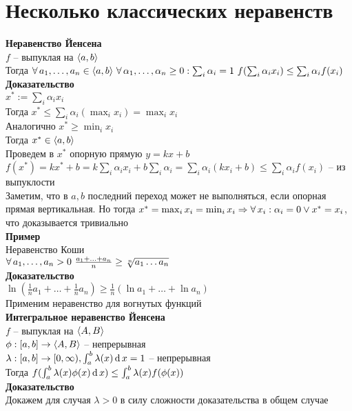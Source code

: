 \documentclass[12pt]{article}
\begin{document}
\section{Несколько классических неравенств}
\textbf{Неравенство Йенсена}\\
$f$ -- выпуклая на $\langle a, b \rangle$\\
Тогда $\fall a_1, \ldots, a_n \in \an ab\ \fall \alpha_1,\ldots,\alpha_n \geq 0: \sum_i \alpha_i = 1\ f(\sum_i \alpha_i x_i) \leq \sum_i \alpha_i f(x_i)$\\
\textbf{Доказательство}\\
$x^* := \sum_i \alpha_i x_i$\\
Тогда $x^* \leq \sum_i \alpha_i (\max_i x_i) = \max_i x_i$\\
Аналогично $x^* \geq \min_i x_i$\\
Тогда $x^* \in \langle a, b \rangle$\\
Проведем в $x^*$ опорную прямую $y = kx+b$\\
$f(x^*) = kx^*+b = k\sum_i \alpha_i x_i + b\sum_i \alpha_i = \sum_i \alpha_i(kx_i + b) \leq \sum_i \alpha_if(x_i)$ -- из выпуклости\\
Заметим, что в $a, b$ последний переход может не выполняться, если опорная прямая вертикальная. Но тогда $x^* = \max_i x_i = \min_i x_i \Rightarrow \forall\, x_i: \alpha_i = 0 \lor x^* = x_i$, что доказывается тривиально\\
\textbf{Пример}\\
Неравенство Коши\\
$\forall\, a_1, \ldots, a_n > 0\ \frac{a_1 + \ldots + a_n}n \geq \sqrt[n]{a_1\ldots a_n}$\\
\textbf{Доказательство}\\
$\ln (\frac1n a_1 + \ldots + \frac1n a_n) \geq \frac1n (\ln a_1 + \ldots + \ln a_n)$\\
Применим неравенство для вогнутых функций\\
\textbf{Интегральное неравенство Йенсена}\\
$f$ -- выпуклая на $\langle A, B \rangle$\\
$\phi: [a,b] \rightarrow \langle A, B \rangle$ -- непрерывная\\
$\lambda: [a,b] \rightarrow [0, \infty), \int_a^b \lambda(x)\operatorname{d} x = 1$ -- непрерывная\\
Тогда $f(\int_a^b \lambda(x)\phi(x)\operatorname{d} x) \leq \int_a^b \lambda(x)f(\phi(x))$\\
\textbf{Доказательство}\\
Докажем для случая $\lambda > 0$ в силу сложности доказательства в общем случае\\
\end{document}
